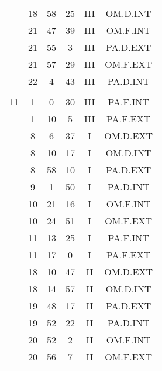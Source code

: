 \documentclass[12pt, a4paper]{article}
\begin{document}
\begin{multicols}{3}
{\begin{tabular}{c c c c c c}
	 	 	 	 & 18 & 58 & 25 & III & OM.D.INT\\%
	 	 	 	 & 21 & 47 & 39 & III & OM.F.INT\\%
	 	 	 	 & 21 & 55 & 3 & III & PA.D.EXT\\%
	 	 	 	 & 21 & 57 & 29 & III & OM.F.EXT\\%
	 	 	 	 & 22 & 4 & 43 & III & PA.D.INT\\%
	 	 	 	 & & & & & \\%
	 	 	 	11 & 1 & 0 & 30 & III & PA.F.INT\\%
	 	 	 	 & 1 & 10 & 5 & III & PA.F.EXT\\%
	 	 	 	 & 8 & 6 & 37 & I & OM.D.EXT\\%
	 	 	 	 & 8 & 10 & 17 & I & OM.D.INT\\%
	 	 	 	 & 8 & 58 & 10 & I & PA.D.EXT\\%
	 	 	 	 & 9 & 1 & 50 & I & PA.D.INT\\%
	 	 	 	 & 10 & 21 & 16 & I & OM.F.INT\\%
	 	 	 	 & 10 & 24 & 51 & I & OM.F.EXT\\%
	 	 	 	 & 11 & 13 & 25 & I & PA.F.INT\\%
	 	 	 	 & 11 & 17 & 0 & I & PA.F.EXT\\%
	 	 	 	 & 18 & 10 & 47 & II & OM.D.EXT\\%
	 	 	 	 & 18 & 14 & 57 & II & OM.D.INT\\%
	 	 	 	 & 19 & 48 & 17 & II & PA.D.EXT\\%
	 	 	 	 & 19 & 52 & 22 & II & PA.D.INT\\%
	 	 	 	 & 20 & 52 & 2 & II & OM.F.INT\\%
	 	 	 	 & 20 & 56 & 7 & II & OM.F.EXT\\%
	 	 \end{tabular}
 	}
\end{multicols}
\end{document}
